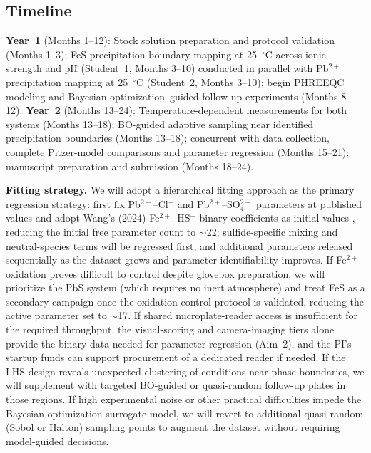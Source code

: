 \documentclass[12pt]{article}
\begin{document}
\subsection{Timeline}

\textbf{Year~1} (Months 1--12): Stock solution preparation and protocol validation (Months 1--3); FeS precipitation boundary mapping at 25~$^\circ$C across ionic strength and pH (Student~1, Months 3--10) conducted in parallel with Pb$^{2+}$ precipitation mapping at 25~$^\circ$C (Student~2, Months 3--10); begin PHREEQC modeling and Bayesian optimization--guided follow-up experiments (Months 8--12). \textbf{Year~2} (Months 13--24): Temperature-dependent measurements for both systems (Months 13--18); BO-guided adaptive sampling near identified precipitation boundaries (Months 13--18); concurrent with data collection, complete Pitzer-model comparisons and parameter regression (Months 15--21); manuscript preparation and submission (Months 18--24).

\textbf{Fitting strategy.} We will adopt a hierarchical fitting approach as the primary regression strategy: first fix Pb$^{2+}$--Cl$^-$ and Pb$^{2+}$--SO$_4^{2-}$ parameters at published values \cite{felmy2000,woosley2013,mgaidi1991} and adopt Wang's (2024) Fe$^{2+}$--HS$^-$ binary coefficients as initial values \cite{wang2024}, reducing the initial free parameter count to $\sim$22; sulfide-specific mixing and neutral-species terms will be regressed first, and additional parameters released sequentially as the dataset grows and parameter identifiability improves. If Fe$^{2+}$ oxidation proves difficult to control despite glovebox preparation, we will prioritize the PbS system (which requires no inert atmosphere) and treat FeS as a secondary campaign once the oxidation-control protocol is validated, reducing the active parameter set to $\sim$17. If shared microplate-reader access is insufficient for the required throughput, the visual-scoring and camera-imaging tiers alone provide the binary data needed for parameter regression (Aim~2), and the PI's startup funds can support procurement of a dedicated reader if needed. If the LHS design reveals unexpected clustering of conditions near phase boundaries, we will supplement with targeted BO-guided or quasi-random follow-up plates in those regions. If high experimental noise or other practical difficulties impede the Bayesian optimization surrogate model, we will revert to additional quasi-random (Sobol or Halton) sampling points to augment the dataset without requiring model-guided decisions.
\end{document}
